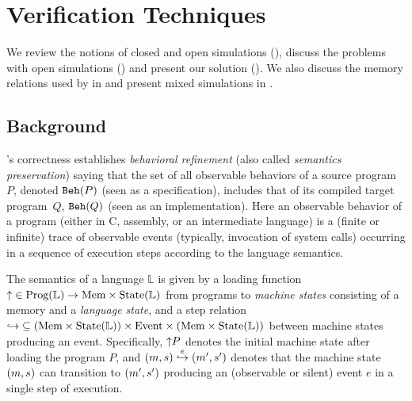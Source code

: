 \chapter{\;\;\;\;Verification Techniques}
\label{sec:overview-verification}

We review the notions of closed and open simulations
(), discuss the problems
with open simulations
() and present our solution
().
We also discuss the memory relations used by \ccm{} in 
and present mixed simulations in .

\section{Background}
\label{sec:overview-verification:background}


\cc{}'s correctness establishes \emph{behavioral refinement}
(also called \emph{semantics preservation}) saying that
the set of all observable behaviors of a source program~$P$, denoted $\mathtt{Beh}({P})$ (seen as a specification),
includes that of its compiled target program~$Q$, \ie $\mathtt{Beh}({Q})$ (seen as an implementation).
Here an observable behavior of a program (either in C, assembly, or an
intermediate language) is a (finite or infinite) trace of observable events
(typically, invocation of system calls) occurring in a sequence of execution steps according to the language semantics.

The semantics of a language $\mathbb{L}$ is given by a loading
function ${{\uparrow}} \in \textrm{Prog}(\mathbb{L}) \to \textrm{Mem}\times\textrm{State}(\mathbb{L})$
from programs to \emph{machine states} consisting of a memory and a \emph{language state},
and a step relation
${\hookrightarrow} \subseteq { (\textrm{Mem}\times\textrm{State}(\mathbb{L})) \times \textrm{Event}\times (\textrm{Mem}\times\textrm{State}(\mathbb{L}))}$
between machine states producing an event.
Specifically, ${\uparrow}{P}$ denotes the initial machine state after loading the program $P$, and
$(m,s) \stackrel{e}{\hookrightarrow} (m',s')$ denotes that the machine state $(m,s)$ can transition to
$(m',s')$ producing an (observable or silent) event $e$ in a single step of
execution.

